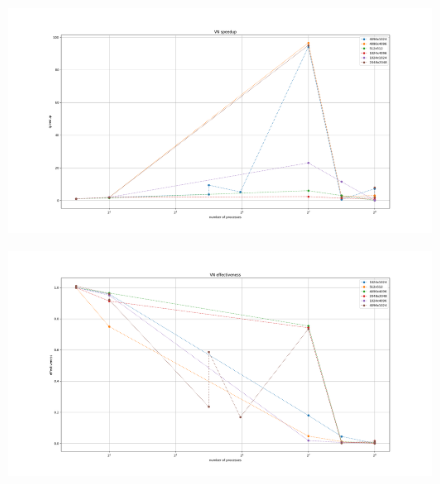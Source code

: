 \documentclass[14pt]{extarticle}
\begin{document}
\begin{figure}[H]
	\centering
	\includegraphics[scale=0.4]{VN_speedup}
\end{figure}

\begin{figure}[H]
	\centering
	\includegraphics[scale=0.4]{VN_effectiveness}
\end{figure}
\end{document}
